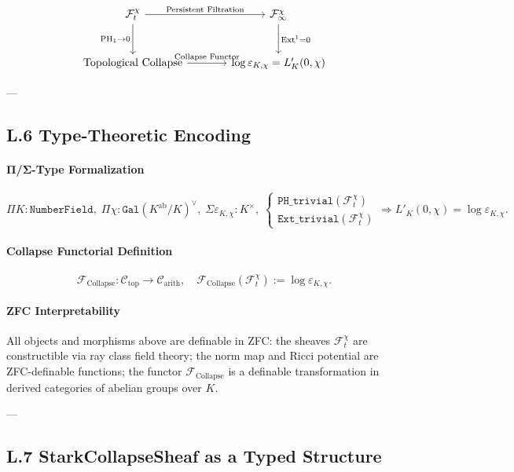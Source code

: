 \documentclass[11pt]{article}
\begin{document}
\[
\begin{tikzcd}[column sep=large, row sep=large]
\mathcal{F}^\chi_t \arrow[r, "\text{Persistent Filtration}"] \arrow[d, "\mathrm{PH}_1 \to 0"'] 
& \mathcal{F}^\chi_\infty \arrow[d, "\mathrm{Ext}^1 = 0"] \\
\text{Topological Collapse} \arrow[r, "\text{Collapse Functor}"] 
& \log \varepsilon_{K,\chi} = L'_K(0,\chi)
\end{tikzcd}
\]

---

\subsection*{L.6 Type-Theoretic Encoding}

\paragraph{Π/Σ-Type Formalization}

\[
\Pi K : \texttt{NumberField}, \;
\Pi \chi : \texttt{Gal}(K^{\text{ab}}/K)^\vee, \;
\Sigma \varepsilon_{K,\chi} : K^\times, \;
\begin{cases}
\texttt{PH\_trivial}(\mathcal{F}^\chi_t) \\
\texttt{Ext\_trivial}(\mathcal{F}^\chi_t)
\end{cases}
\Rightarrow
L'_K(0,\chi) = \log \varepsilon_{K,\chi}.
\]

\paragraph{Collapse Functorial Definition}

\[
\mathcal{F}_{\mathrm{Collapse}} : \mathcal{C}_{\mathrm{top}} \to \mathcal{C}_{\mathrm{arith}},
\quad
\mathcal{F}_{\mathrm{Collapse}}(\mathcal{F}_t^\chi) := \log \varepsilon_{K,\chi}.
\]

\paragraph{ZFC Interpretability}

All objects and morphisms above are definable in ZFC: the sheaves $\mathcal{F}^\chi_t$ are constructible via ray class field theory; the norm map and Ricci potential are ZFC-definable functions; the functor $\mathcal{F}_{\mathrm{Collapse}}$ is a definable transformation in derived categories of abelian groups over $K$.

---

\subsection*{L.7 StarkCollapseSheaf as a Typed Structure}
\end{document}
